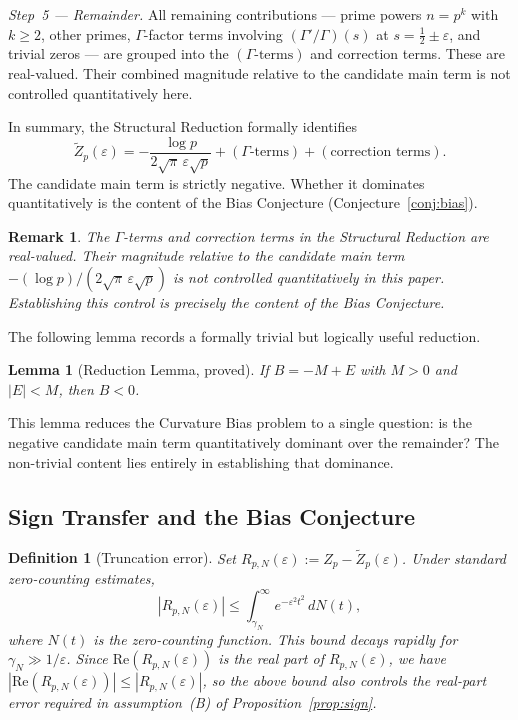 \documentclass[11pt]{article}
\newtheorem{lemma}[theorem]{Lemma}
\newtheorem{definition}[theorem]{Definition}
\newtheorem*{remark}{Remark}
\newcommand{\Zt}{\widetilde{Z}}
\begin{document}
\textit{Step~5 --- Remainder.}
All remaining contributions --- prime powers $n=p^k$ with $k\geq 2$,
other primes, $\Gamma$-factor terms involving $(\Gamma'/\Gamma)(s)$
at $s=\tfrac{1}{2}\pm\varepsilon$, and trivial zeros --- are grouped into
the $(\Gamma\text{-terms})$ and correction terms.
These are real-valued.
Their combined magnitude relative to the candidate main term
is not controlled quantitatively here.

In summary, the Structural Reduction formally identifies
\[
\Zt_p(\varepsilon)
  = -\frac{\log p}{2\sqrt{\pi}\,\varepsilon\sqrt{p}}
    + (\Gamma\text{-terms}) + (\text{correction terms}).
\]
The candidate main term is strictly negative.
Whether it dominates quantitatively is the content of the
Bias Conjecture (Conjecture~\ref{conj:bias}).

\begin{remark}
The $\Gamma$-terms and correction terms in the Structural Reduction
are real-valued. Their magnitude relative to the candidate main term
$-(\log p)/(2\sqrt{\pi}\,\varepsilon\sqrt{p})$ is not controlled
quantitatively in this paper. Establishing this control is precisely
the content of the Bias Conjecture.
\end{remark}

The following lemma records a formally trivial but logically
useful reduction.

\begin{lemma}[Reduction Lemma, proved]
\label{lem:reduction}
If $B = -M + E$ with $M>0$ and $|E|<M$, then $B<0$.
\end{lemma}

This lemma reduces the Curvature Bias problem to a single question:
is the negative candidate main term quantitatively dominant over the
remainder?
The non-trivial content lies entirely in establishing that dominance.

\subsection{Sign Transfer and the Bias Conjecture}
\label{ssec:sign}

\begin{definition}[Truncation error]
\label{def:trunc}
Set $R_{p,N}(\varepsilon) := Z_p - \Zt_p(\varepsilon)$.
Under standard zero-counting estimates,
\[
|R_{p,N}(\varepsilon)| \leq \int_{\gamma_N}^\infty e^{-\varepsilon^2 t^2}\,dN(t),
\]
where $N(t)$ is the zero-counting function.
This bound decays rapidly for $\gamma_N\gg 1/\varepsilon$.
Since $\mathrm{Re}(R_{p,N}(\varepsilon))$ is the real part of $R_{p,N}(\varepsilon)$,
we have $|\mathrm{Re}(R_{p,N}(\varepsilon))|\leq|R_{p,N}(\varepsilon)|$,
so the above bound also controls the real-part error required
in assumption~(B) of Proposition~\ref{prop:sign}.
\end{definition}
\end{document}
